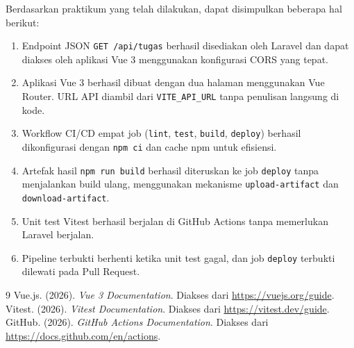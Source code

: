\documentclass[a4paper,oneside,11pt]{book}
\begin{document}
Berdasarkan praktikum yang telah dilakukan, dapat disimpulkan beberapa hal berikut:
\begin{enumerate}
    \item Endpoint JSON \texttt{GET /api/tugas} berhasil disediakan oleh Laravel dan dapat diakses oleh aplikasi Vue 3 menggunakan konfigurasi CORS yang tepat.
    \item Aplikasi Vue 3 berhasil dibuat dengan dua halaman menggunakan Vue Router. URL API diambil dari \texttt{VITE\_API\_URL} tanpa penulisan langsung di kode.
    \item Workflow CI/CD empat job (\texttt{lint}, \texttt{test}, \texttt{build}, \texttt{deploy}) berhasil dikonfigurasi dengan \texttt{npm ci} dan cache npm untuk efisiensi.
    \item Artefak hasil \texttt{npm run build} berhasil diteruskan ke job \texttt{deploy} tanpa menjalankan build ulang, menggunakan mekanisme \texttt{upload-artifact} dan \texttt{download-artifact}.
    \item Unit test Vitest berhasil berjalan di GitHub Actions tanpa memerlukan Laravel berjalan.
    \item Pipeline terbukti berhenti ketika unit test gagal, dan job \texttt{deploy} terbukti dilewati pada Pull Request.
\end{enumerate}

\clearpage

\begin{thebibliography}{9}
Vue.js. (2026). \textit{Vue 3 Documentation}. Diakses dari \url{https://vuejs.org/guide}.
Vitest. (2026). \textit{Vitest Documentation}. Diakses dari \url{https://vitest.dev/guide}.
GitHub. (2026). \textit{GitHub Actions Documentation}. Diakses dari \url{https://docs.github.com/en/actions}.
\end{thebibliography}
\end{document}
